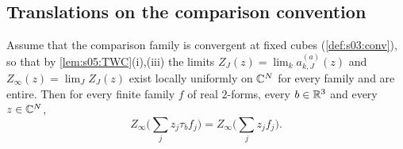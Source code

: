 \subsection{Translations on the comparison convention}

\begin{proposition}\label{prop:s06:translations}
Assume that the comparison family is convergent at fixed cubes (\cref{def:s03:conv}), so that by \cref{lem:s05:TWC}(i),(iii) the limits $Z_J(z)=\lim_ka^{(a)}_{k,J}(z)$ and $Z_\infty(z)=\lim_JZ_J(z)$ exist locally uniformly on $\mathbb C^N$ for every family and are entire. Then for every finite family $f$ of real $2$-forms, every $b\in\mathbb R^3$ and every $z\in\mathbb C^N$,
\[
Z_\infty\Big(\sum_jz_j\tau_bf_j\Big)=Z_\infty\Big(\sum_jz_jf_j\Big).
\]
\end{proposition}

